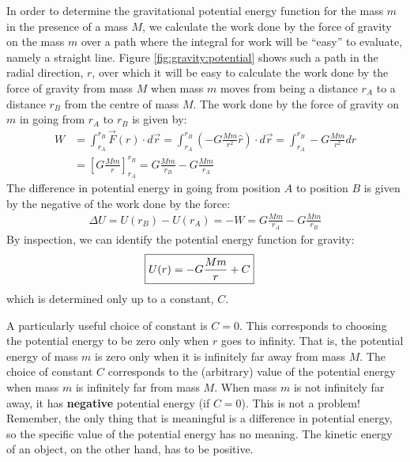 In order to determine the gravitational potential energy function for the mass $m$ in the presence of a mass $M$, we calculate the work done by the force of gravity on the mass $m$ over a path where the integral for work will be ``easy'' to evaluate, namely a straight line. Figure \ref{fig:gravity:potential} shows such a path in the radial direction, $r$, over which it will be easy to calculate the work done by the force of gravity from mass $M$ when mass $m$ moves from being a distance $r_A$ to a distance $r_B$ from the centre of mass $M$.
The work done by the force of gravity on $m$ in going from $r_A$ to $r_B$ is given by:
\begin{align*}
W &= \int_{r_A}^{r_B}\vec F(r) \cdot d\vec r = \int_{r_A}^{r_B} \left(- G\frac{Mm}{r^2}\hat r \right)\cdot d\vec r =\int_{r_A}^{r_B} - G\frac{Mm}{r^2}dr\\
&=\left[G\frac{Mm}{r} \right]_{r_A}^{r_B} =G\frac{Mm}{r_B} - G\frac{Mm}{r_A}
\end{align*}
The difference in potential energy in going from position $A$ to position $B$ is given by the negative of the work done by the force:
\begin{align*}
\Delta U = U(r_B) - U(r_A) = -W = G\frac{Mm}{r_A} - G\frac{Mm}{r_B}
\end{align*}
By inspection, we can identify the potential energy function for gravity:
\begin{align}
\Aboxed{U(r) = -G\frac{Mm}{r} + C}
\end{align}
which is determined only up to a constant, $C$. 

A particularly useful choice of constant is $C=0$. This corresponds to choosing the potential energy to be zero only when $r$ goes to infinity. That is, the potential energy of mass $m$ is zero only when it is infinitely far away from mass $M$. The choice of constant $C$ corresponds to the (arbitrary) value of the potential energy when mass $m$ is infinitely far from mass $M$. When mass $m$ is not infinitely far away, it has \textbf{negative} potential energy (if $C=0$). This is not a problem! Remember, the only thing that is meaningful is a difference in potential energy, so the specific value of the potential energy has no meaning. The kinetic energy of an object, on the other hand, has to be positive.

